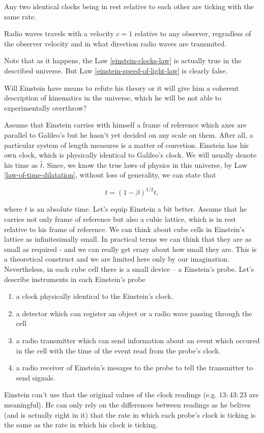 \documentclass[main.tex]{subfiles}
\begin{document}
\begin{law}
\label{einstein-clocks-law}
Any two identical clocks being in rest relative to each other are ticking with the same rate.
\end{law}
 
\begin{law}
\label{einstein-speed-of-light-law}
Radio waves travels with a velocity $c = 1$ relative to any observer, regradless of the observer velocity and in what direction radio waves are transmited.
\end{law}

Note that as it happens, the Law \ref{einstein-clocks-law} is actually true in the described universe. But Law \ref{einstein-speed-of-light-law} is clearly false.

Will Einstein have means to refute his theory or it will give him a coherent description of kinematics in the universe, which he will be not able to experimentally overthrow?

Assume that Einstein carries with himself a frame of reference which axes are parallel to Galileo's but he hasn't yet decided on any scale on them. After all, a particular system of length measures is a matter of convetion. Einstein has his own clock, which is physically identical to Galileo's clock. We will usually denote his time as $\hat{t}$.
Since, we know the true laws of physics in this universe, by Law \ref{law-of-time-dilatation}, without loss of generality, we can state that 

\begin{equation}
\label{ether-time-dilatation}
\hat{t} = (1 - \beta)^{1/2} t,
\end{equation} 

where $t$ is an absolute time. Let's equip Einstein a bit better. Assume that he carries not only frame of reference but also a cubic lattice, which is in rest relative to his frame of reference. We can think about cube cells in Einstein's lattice as infinitesimally small. In practical terms we can think that they are as small as required - and we can really get crazy about how small they are. This is a theoretical construct and we are limited here only by our imagination. Nevertheless, in each cube cell there is a small device -- a Einstein's probe. Let's describe instruments in each Einstein's probe
\begin{enumerate}
\item a clock physically identical to the Einstein's clock.
\item a detector which can register an object or a radio wave passing through the cell
\item a radio transmitter which can send information about an event which occured in the cell with the time of the event read from the probe's clock.
\item a radio receiver of Einstein's mesages to the probe to tell the transmitter to send signals.
 \end{enumerate} 
Einstein can't use that the original values of the clock readings (e.g. $13:43:23$ are meaningful). He can only rely on the differences between readings as he belives (and is actually right in it) that the rate in which each probe's clock is ticking is the same as the rate in which his clock is ticking.
\end{document}
